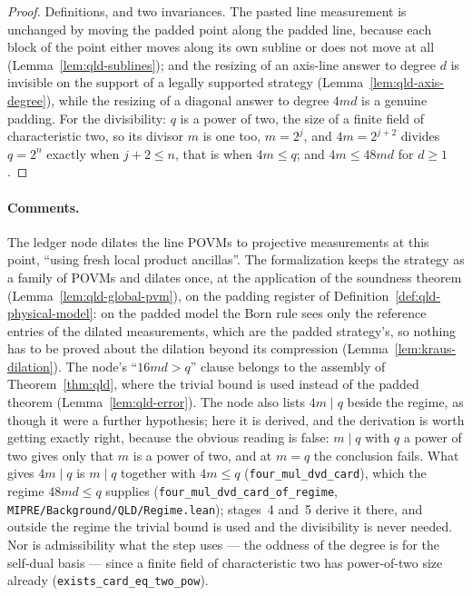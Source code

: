 \begin{proof}
\leanok
Definitions, and two invariances. The pasted line measurement is unchanged by moving the padded
point along the padded line, because each block of the point either moves along its own subline
or does not move at all (Lemma~\ref{lem:qld-sublines}); and the resizing of an axis-line answer to
degree $d$ is invisible on the support of a legally supported strategy
(Lemma~\ref{lem:qld-axis-degree}), while the resizing of a diagonal answer to degree $4md$ is a
genuine padding. For the divisibility: $q$ is a power of two, the size of a finite field of
characteristic two, so its divisor $m$ is one too, $m = 2^j$, and $4m = 2^{j+2}$ divides $q = 2^n$
exactly when $j + 2 \leq n$, that is when $4m \leq q$; and $4m \leq 48md$ for $d \geq 1$.
\end{proof}

\paragraph{Comments.} The ledger node dilates the line POVMs to projective measurements at this
point, ``using fresh local product ancillas''. The formalization keeps the strategy as a family of
POVMs and dilates once, at the application of the soundness theorem
(Lemma~\ref{lem:qld-global-pvm}), on the padding register of
Definition~\ref{def:qld-physical-model}: on the padded model the Born rule sees only the reference
entries of the dilated measurements, which are the padded strategy's, so nothing has to be proved
about the dilation beyond its compression (Lemma~\ref{lem:kraus-dilation}). The node's
``$16md > q$'' clause belongs to the assembly of Theorem~\ref{thm:qld}, where the trivial bound is
used instead of the padded theorem (Lemma~\ref{lem:qld-error}). The node also lists $4m \mid q$
beside the regime, as though it were a further hypothesis; here it is derived, and the derivation is
worth getting exactly right, because the obvious reading is false: $m \mid q$ with $q$ a power of
two gives only that $m$ is a power of two, and at $m = q$ the conclusion fails. What gives
$4m \mid q$ is $m \mid q$ together with $4m \leq q$ (\texttt{four\_mul\_dvd\_card}), which the
regime $48md \leq q$ supplies (\texttt{four\_mul\_dvd\_card\_of\_regime},
\texttt{MIPRE/Background/QLD/Regime.lean}); stages~4 and~5 derive it there, and outside the regime
the trivial bound is used and the divisibility is never needed. Nor is admissibility what the step
uses --- the oddness of the degree is for the self-dual basis --- since a finite field of
characteristic two has power-of-two size already (\texttt{exists\_card\_eq\_two\_pow}).


